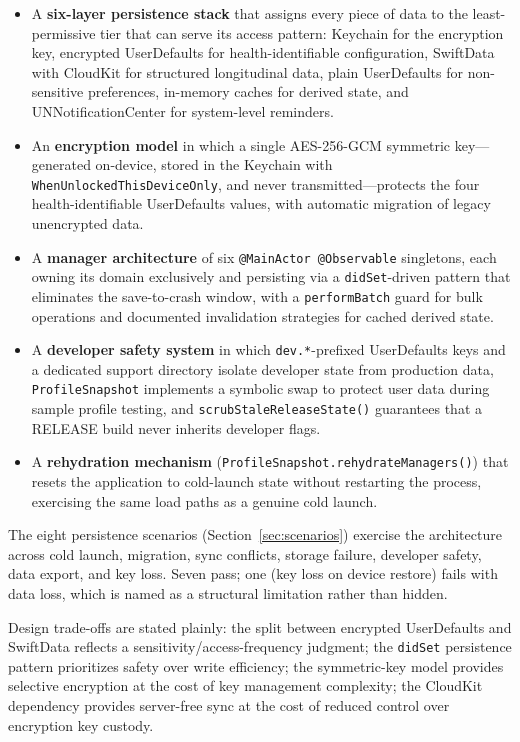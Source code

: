 \documentclass[11pt,a4paper]{article}
\newcommand{\code}[1]{\texttt{\small #1}}
\begin{document}
\begin{itemize}[nosep,leftmargin=1.4em]
\item A \textbf{six-layer persistence stack} that assigns every piece of data
  to the least-permissive tier that can serve its access pattern: Keychain
  for the encryption key, encrypted UserDefaults for health-identifiable
  configuration, SwiftData with CloudKit for structured longitudinal data,
  plain UserDefaults for non-sensitive preferences, in-memory caches for
  derived state, and UNNotificationCenter for system-level reminders.
\item An \textbf{encryption model} in which a single AES-256-GCM symmetric
  key---generated on-device, stored in the Keychain with
  \code{WhenUnlockedThisDeviceOnly}, and never transmitted---protects the
  four health-identifiable UserDefaults values, with automatic migration of
  legacy unencrypted data.
\item A \textbf{manager architecture} of six \code{@MainActor @Observable}
  singletons, each owning its domain exclusively and persisting via a
  \code{didSet}-driven pattern that eliminates the save-to-crash window, with
  a \code{performBatch} guard for bulk operations and documented
  invalidation strategies for cached derived state.
\item A \textbf{developer safety system} in which \code{dev.*}-prefixed
  UserDefaults keys and a dedicated support directory isolate developer
  state from production data, \code{ProfileSnapshot} implements a symbolic
  swap to protect user data during sample profile testing, and
  \code{scrubStaleReleaseState()} guarantees that a RELEASE build never
  inherits developer flags.
\item A \textbf{rehydration mechanism} (\code{ProfileSnapshot.rehydrateManagers()})
  that resets the application to cold-launch state without restarting the
  process, exercising the same load paths as a genuine cold launch.
\end{itemize}

The eight persistence scenarios (Section~\ref{sec:scenarios}) exercise the
architecture across cold launch, migration, sync conflicts, storage failure,
developer safety, data export, and key loss. Seven pass; one (key loss on
device restore) fails with data loss, which is named as a structural
limitation rather than hidden.

Design trade-offs are stated plainly: the split between encrypted
UserDefaults and SwiftData reflects a sensitivity/access-frequency
judgment; the \code{didSet} persistence pattern prioritizes safety over write
efficiency; the symmetric-key model provides selective encryption at the cost
of key management complexity; the CloudKit dependency provides server-free
sync at the cost of reduced control over encryption key custody.
\end{document}
